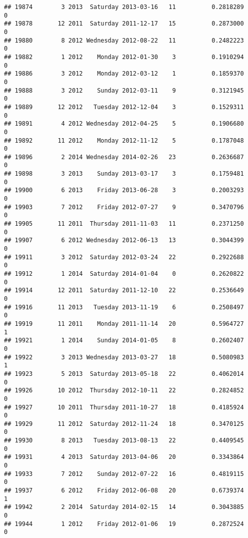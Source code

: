 \documentclass[
]{article}
\begin{document}
\begin{verbatim}
## 19874        3 2013  Saturday 2013-03-16   11          0.2818289             0
## 19878       12 2011  Saturday 2011-12-17   15          0.2873000             0
## 19880        8 2012 Wednesday 2012-08-22   11          0.2482223             0
## 19882        1 2012    Monday 2012-01-30    3          0.1910294             0
## 19886        3 2012    Monday 2012-03-12    1          0.1859370             0
## 19888        3 2012    Sunday 2012-03-11    9          0.3121945             0
## 19889       12 2012   Tuesday 2012-12-04    3          0.1529311             0
## 19891        4 2012 Wednesday 2012-04-25    5          0.1906680             0
## 19892       11 2012    Monday 2012-11-12    5          0.1787048             0
## 19896        2 2014 Wednesday 2014-02-26   23          0.2636687             0
## 19898        3 2013    Sunday 2013-03-17    3          0.1759481             0
## 19900        6 2013    Friday 2013-06-28    3          0.2003293             0
## 19903        7 2012    Friday 2012-07-27    9          0.3470796             0
## 19905       11 2011  Thursday 2011-11-03   11          0.2371250             0
## 19907        6 2012 Wednesday 2012-06-13   13          0.3044399             0
## 19911        3 2012  Saturday 2012-03-24   22          0.2922688             0
## 19912        1 2014  Saturday 2014-01-04    0          0.2620822             0
## 19914       12 2011  Saturday 2011-12-10   22          0.2536649             0
## 19916       11 2013   Tuesday 2013-11-19    6          0.2508497             0
## 19919       11 2011    Monday 2011-11-14   20          0.5964727             1
## 19921        1 2014    Sunday 2014-01-05    8          0.2602407             0
## 19922        3 2013 Wednesday 2013-03-27   18          0.5080983             1
## 19923        5 2013  Saturday 2013-05-18   22          0.4062014             0
## 19926       10 2012  Thursday 2012-10-11   22          0.2824852             0
## 19927       10 2011  Thursday 2011-10-27   18          0.4185924             0
## 19929       11 2012  Saturday 2012-11-24   18          0.3470125             0
## 19930        8 2013   Tuesday 2013-08-13   22          0.4409545             0
## 19931        4 2013  Saturday 2013-04-06   20          0.3343864             0
## 19933        7 2012    Sunday 2012-07-22   16          0.4819115             0
## 19937        6 2012    Friday 2012-06-08   20          0.6739374             1
## 19942        2 2014  Saturday 2014-02-15   14          0.3043885             0
## 19944        1 2012    Friday 2012-01-06   19          0.2872524             0

\end{verbatim}
\end{document}
